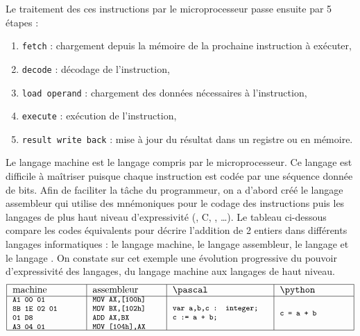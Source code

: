 Le traitement des ces instructions par le microprocesseur
passe ensuite par 5 étapes :
\begin{enumerate}
\item {\tt fetch} : chargement depuis la mémoire de la prochaine instruction 
	à exécuter,
\item {\tt decode} : décodage de l'instruction,
\item {\tt load operand} : chargement des données nécessaires à l'instruction,
\item {\tt execute} : exécution de l'instruction,
\item {\tt result write back} : mise à jour du résultat dans un registre 
	ou en mémoire.
\end{enumerate}

Le langage machine est le langage compris par le microprocesseur. 
Ce langage est difficile à maîtriser puisque chaque instruction est 
codée par une séquence donnée de bits. Afin de faciliter la tâche 
du programmeur, on a d'abord créé le langage assembleur qui utilise 
des mnémoniques pour le codage des instructions puis les langages de 
plus haut niveau d'expressivité ({\fortran}, {\sc C}, {\java},
{\python}\ldots). Le tableau ci-dessous compare les codes
équivalents pour décrire l'addition de 2 entiers dans différents langages
informatiques : le langage machine, le langage assembleur, le langage {\pascal} 
et le langage {\python}. On constate sur cet exemple
une évolution progressive du pouvoir d'expressivité des langages,
du langage machine aux langages de haut niveau.
$$\begin{tabular}{|l|l|l|l|}
\hline
machine & assembleur & {\pascal} & {\python} \\
\hline
\begin{minipage}{2.5cm}\footnotesize\tt
A1 00 01\\
8B 1E 02 01\\
01 D8\\
A3 04 01
\end{minipage} &	
\begin{minipage}{2.5cm}\footnotesize\tt
MOV AX,[100h]\\
MOV BX,[102h]\\
ADD AX,BX\\
MOV [104h],AX 	
\end{minipage} &	
\begin{minipage}{3.5cm}\footnotesize\tt
var a,b,c : integer;\\
c := a + b;
\end{minipage} &	
\begin{minipage}{2.5cm}\footnotesize\tt
c = a + b
\end{minipage} \\
\hline
\end{tabular}$$


